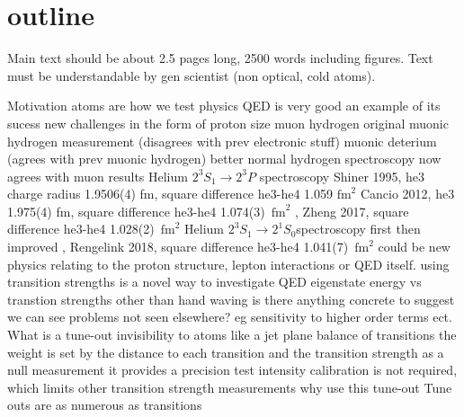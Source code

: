 \documentclass[aps,prl,
,reprint,
superscriptaddress,
onecolumn,
showpacs,preprintnumbers,
 amsmath,amssymb,
]{revtex4-1}
\newcommand{\MetastableState}{2^{3\!}S_1}%
\newcommand{\LowerStateManifold}{2^{3\!}P}%
\newcommand{\SingletState}{2^{1\!}S_0}%
\begin{document}
\section{outline}
Main text should be about 2.5 pages long, 2500 words  including figures. Text must be understandable by gen scientist (non optical, cold atoms).
\begin{outline}[enumerate]
\1 Motivation
    \2 atoms are how we test physics
    \2 QED is very good
        \3 an example of its sucess
    \2 new challenges in the form of proton size 
        \3 muon hydrogen 
            \4 original muonic hydrogen \cite{Pohl2010} measurement (disagrees with prev electronic stuff)
            \4 muonic deterium \cite{Pohl669} (agrees with prev muonic hydrogen)
            \4 better normal hydrogen spectroscopy \cite{Bezginov1007}  now agrees with muon results
        \3 Helium \(\MetastableState \rightarrow \LowerStateManifold\)  spectroscopy 
            \4 \cite{PhysRevLett.74.3553} Shiner 1995, he3 charge radius 1.9506(4) fm, square difference he3-he4 1.059 \(\text{fm}^2\)
            \4 \cite{PhysRevLett.108.143001} Cancio 2012, he3 1.975(4) fm, square difference he3-he4 1.074(3)~\(\text{fm}^2\)
            \4 \cite{PhysRevLett.119.263002}, Zheng 2017, square difference he3-he4 1.028(2)~\(\text{fm}^2\)
        \3 Helium \(\MetastableState \rightarrow \SingletState \)spectroscopy
            \4 first \cite{vanRooij196} then improved \cite{Rengelink2018}, Rengelink 2018,  square difference he3-he4 1.041(7)~\(\text{fm}^2\) 
        \3 could be new physics relating to the proton structure, lepton interactions or QED itself.
    \2  using transition strengths is a novel way to investigate QED
        \3 eigenstate energy vs transtion strengths
        \3 other than hand waving is there anything concrete to suggest we can see problems not seen elsewhere? eg sensitivity to higher order terms ect.
\1 What is a tune-out
    \2 invisibility to atoms
        \3 like a jet plane
    \2 balance of transitions 
        \3 the weight is set by the distance to each transition and the transition strength
    \2 as a null measurement it provides a precision test
        \3 intensity calibration is not required, which limits other transition strength measurements
\1 why use this tune-out
    \2 Tune outs are as numerous as transitions

\end{outline}
\end{document}
